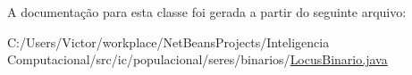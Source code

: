 A documentação para esta classe foi gerada a partir do seguinte arquivo\-:\begin{DoxyCompactItemize}
\item 
C\-:/\-Users/\-Victor/workplace/\-Net\-Beans\-Projects/\-Inteligencia Computacional/src/ic/populacional/seres/binarios/\hyperlink{_locus_binario_8java}{Locus\-Binario.\-java}\end{DoxyCompactItemize}
